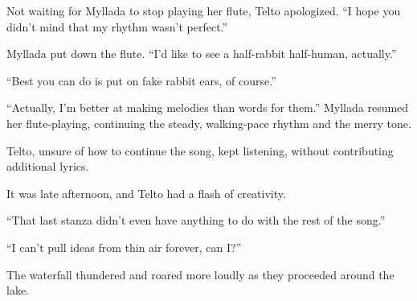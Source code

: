 Not waiting for Myllada to stop playing her flute, Telto apologized. ``I hope you didn't mind that my rhythm wasn't perfect.''

Myllada put down the flute. ``I'd like to see a half-rabbit half-human, actually.''

``Best you can do is put on fake rabbit ears, of course.''

``Actually, I'm better at making melodies than words for them.'' Myllada resumed her flute-playing, continuing the steady, walking-pace rhythm and the merry tone.

Telto, unsure of how to continue the song, kept listening, without contributing additional lyrics.

\centeredstars

It was late afternoon, and Telto had a flash of creativity.


``That last stanza didn't even have anything to do with the rest of the song.''

``I can't pull ideas from thin air forever, can I?''

The waterfall thundered and roared more loudly as they proceeded around the lake.


